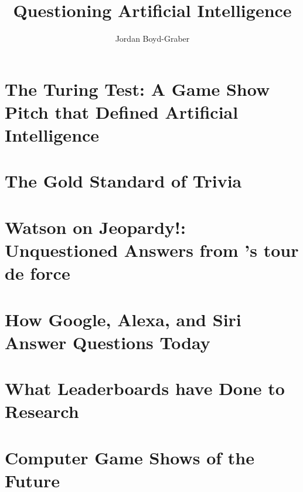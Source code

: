 \documentclass[bfivepaper,twosided,justified,nobib]{tufte-book}
\title{Questioning Artificial Intelligence}
\author{Jordan Boyd-Graber}
\newcommand{\chapterfile}[2]{\chapter{#2}
  \label{ch:#1}
  }
\begin{document}
\setcounter{secnumdepth}{0}














\clearpage






\chapterfile{turing}{The Turing Test: A Game Show Pitch that Defined Artificial Intelligence}

\chapterfile{qb}{The Gold Standard of Trivia}

\chapterfile{watson}{Watson on Jeopardy!: \\ Unquestioned Answers from
\abr{ibm}'s tour de force}

\chapterfile{modern-qa}{How Google, Alexa, and Siri Answer Questions Today}



\chapterfile{leaderboard}{What Leaderboards have Done to \abr{ai} Research}









\chapterfile{game-show}{Computer Game Shows of the Future}





\backmatter





\printindex
\end{document}

